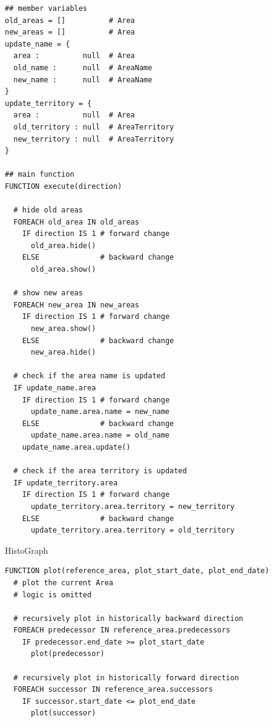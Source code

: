 \begin{lstlisting}[language=pseudocode,
  caption=class HGOperation]
## member variables
old_areas = []          # Area
new_areas = []          # Area
update_name = {
  area :          null  # Area
  old_name :      null  # AreaName
  new_name :      null  # AreaName
}
update_territory = {
  area :          null  # Area
  old_territory : null  # AreaTerritory
  new_territory : null  # AreaTerritory
}

## main function
FUNCTION execute(direction)

  # hide old areas
  FOREACH old_area IN old_areas
    IF direction IS 1 # forward change
      old_area.hide()
    ELSE              # backward change
      old_area.show()

  # show new areas
  FOREACH new_area IN new_areas
    IF direction IS 1 # forward change
      new_area.show()
    ELSE              # backward change
      new_area.hide()

  # check if the area name is updated
  IF update_name.area
    IF direction IS 1 # forward change
      update_name.area.name = new_name
    ELSE              # backward change
      update_name.area.name = old_name
    update_name.area.update()

  # check if the area territory is updated
  IF update_territory.area
    IF direction IS 1 # forward change
      update_territory.area.territory = new_territory
    ELSE              # backward change
      update_territory.area.territory = old_territory

\end{lstlisting}


HistoGraph
\begin{lstlisting}[language=pseudocode,
  caption=plotting Areas on the HistoGraph,
  label=lst:histograph_plot]
FUNCTION plot(reference_area, plot_start_date, plot_end_date)
  # plot the current Area
  # logic is omitted

  # recursively plot in historically backward direction
  FOREACH predecessor IN reference_area.predecessors
    IF predecessor.end_date >= plot_start_date
      plot(predecessor)

  # recursively plot in historically forward direction
  FOREACH successor IN reference_area.successors
    IF successor.start_date <= plot_end_date
      plot(successor)
\end{lstlisting}

